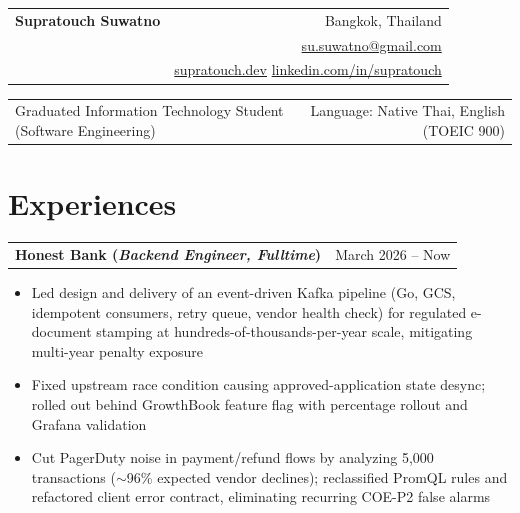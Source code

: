 \documentclass[letterpaper,9pt]{extarticle}
\makeatletter
\newcommand{\entry}[2]{%
  \vspace{0.6ex}%
  \noindent\begin{tabularx}{\textwidth}{@{}X r@{}}
    \textbf{#1} & #2 \\
  \end{tabularx}%
  \vspace{-0.2ex}%
}
\newcommand{\role}[1]{(\textit{#1})}
\makeatother
\begin{document}
\begin{tabularx}{\textwidth}{@{}X r@{}}
  {\LARGE\bfseries Supratouch Suwatno} & Bangkok, Thailand \\[0.35ex]
   & \href{mailto:su.suwatno@gmail.com}{su.suwatno@gmail.com}  \\[0.35ex]
   & \href{https://supratouch.dev}{supratouch.dev} \quad
     \href{https://linkedin.com/in/supratouch}{linkedin.com/in/supratouch} \\
\end{tabularx}

\vspace{0.6ex}
\begin{tabularx}{\textwidth}{@{}X r@{}}
  Graduated Information Technology Student (Software Engineering) &
  Language: Native Thai, English (TOEIC 900) \\
\end{tabularx}

\section{Experiences}

\entry{Honest Bank \role{Backend Engineer, Fulltime}}{March 2026 -- Now}
\begin{itemize}
  \item Led design and delivery of an event-driven Kafka pipeline (Go, GCS, idempotent consumers, retry queue, vendor health check) for regulated e-document stamping at hundreds-of-thousands-per-year scale, mitigating multi-year penalty exposure
  \item Fixed upstream race condition causing approved-application state desync; rolled out behind GrowthBook feature flag with percentage rollout and Grafana validation
  \item Cut PagerDuty noise in payment/refund flows by analyzing 5,000 transactions ($\sim$96\% expected vendor declines); reclassified PromQL rules and refactored client error contract, eliminating recurring COE-P2 false alarms
\end{itemize}
\end{document}
